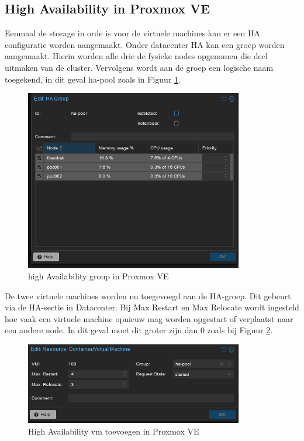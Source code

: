 \subsection{High Availability in Proxmox VE}
\label{sec:ha-proxmox}
Eenmaal de storage in orde is voor de virtuele machines kan er een HA configuratie worden aangemaakt. 
Onder datacenter HA kan een groep worden aangemaakt. Hierin worden alle drie de fysieke nodes opgenomen die deel uitmaken van de cluster. Vervolgens wordt aan de groep een logische naam toegekend, in dit geval ha-pool zoals in Figuur \ref{fig:ha-group}.
\begin{figure}[H]
  \centering
  \includegraphics[width=0.85\textwidth]{../poc/ha-group.png}
  \caption{high Availability group in Proxmox VE}
  \label{fig:ha-group}
\end{figure}
De twee virtuele machines worden nu toegevoegd aan de HA-groep. Dit gebeurt via de HA-sectie in Datacenter.
Bij Max Restart en Max Relocate wordt ingesteld hoe vaak een virtuele machine opnieuw mag worden opgestart of verplaatst naar een andere node. In dit geval moet dit groter zijn dan 0 zoals bij Figuur \ref{fig:ha-vm}.
\begin{figure}[H]
  \centering
  \includegraphics[width=0.85\textwidth]{../poc/vm-ha.png}
  \caption{High Availability vm toevoegen in Proxmox VE}
  \label{fig:ha-vm}
\end{figure}


